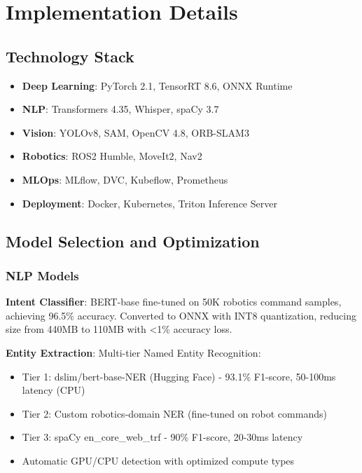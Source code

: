 \documentclass[conference]{IEEEtran}
\begin{document}
\section{Implementation Details}
\label{sec:implementation}

\subsection{Technology Stack}

\begin{itemize}
    \item \textbf{Deep Learning}: PyTorch 2.1, TensorRT 8.6, ONNX Runtime
    \item \textbf{NLP}: Transformers 4.35, Whisper, spaCy 3.7
    \item \textbf{Vision}: YOLOv8, SAM, OpenCV 4.8, ORB-SLAM3
    \item \textbf{Robotics}: ROS2 Humble, MoveIt2, Nav2
    \item \textbf{MLOps}: MLflow, DVC, Kubeflow, Prometheus
    \item \textbf{Deployment}: Docker, Kubernetes, Triton Inference Server
\end{itemize}

\subsection{Model Selection and Optimization}

\subsubsection{NLP Models}

\textbf{Intent Classifier}: BERT-base fine-tuned on 50K robotics command samples, achieving 96.5\% accuracy. Converted to ONNX with INT8 quantization, reducing size from 440MB to 110MB with <1\% accuracy loss.

\textbf{Entity Extraction}: Multi-tier Named Entity Recognition:
\begin{itemize}
    \item Tier 1: dslim/bert-base-NER (Hugging Face) - 93.1\% F1-score, 50-100ms latency (CPU)
    \item Tier 2: Custom robotics-domain NER (fine-tuned on robot commands)
    \item Tier 3: spaCy en\_core\_web\_trf - 90\% F1-score, 20-30ms latency
    \item Automatic GPU/CPU detection with optimized compute types
\end{itemize}
\end{document}
